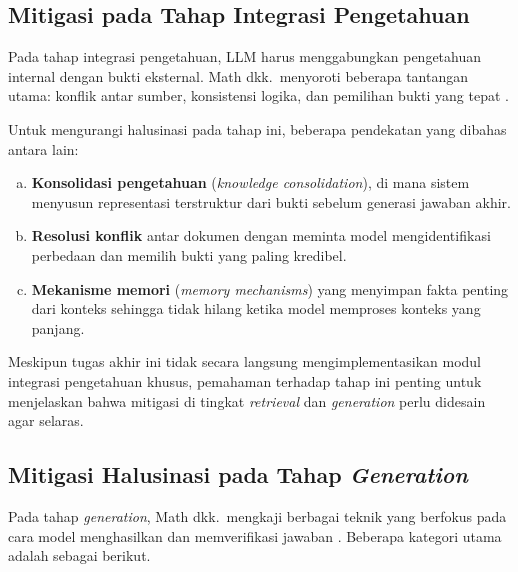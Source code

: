 
\subsection{Mitigasi pada Tahap Integrasi Pengetahuan}
\label{subsec:integration-mitigation}

Pada tahap integrasi pengetahuan, LLM harus menggabungkan pengetahuan internal dengan bukti eksternal. Math dkk.\ menyoroti beberapa tantangan utama: konflik antar sumber, konsistensi logika, dan pemilihan bukti yang tepat \parencite{math2024hallucination}.

Untuk mengurangi halusinasi pada tahap ini, beberapa pendekatan yang dibahas antara lain:

\begin{enumerate}[a.]
  \item \textbf{Konsolidasi pengetahuan} (\textit{knowledge consolidation}), di mana sistem menyusun representasi terstruktur dari bukti sebelum generasi jawaban akhir.
  \item \textbf{Resolusi konflik} antar dokumen dengan meminta model mengidentifikasi perbedaan dan memilih bukti yang paling kredibel.
  \item \textbf{Mekanisme memori} (\textit{memory mechanisms}) yang menyimpan fakta penting dari konteks sehingga tidak hilang ketika model memproses konteks yang panjang.
\end{enumerate}

Meskipun tugas akhir ini tidak secara langsung mengimplementasikan modul integrasi pengetahuan khusus, pemahaman terhadap tahap ini penting untuk menjelaskan bahwa mitigasi di tingkat \textit{retrieval} dan \textit{generation} perlu didesain agar selaras.


\subsection{Mitigasi Halusinasi pada Tahap \textit{Generation}}
\label{subsec:generation-mitigation}

Pada tahap \textit{generation}, Math dkk.\ mengkaji berbagai teknik yang berfokus pada cara model menghasilkan dan memverifikasi jawaban \parencite{math2024hallucination}. Beberapa kategori utama adalah sebagai berikut.

